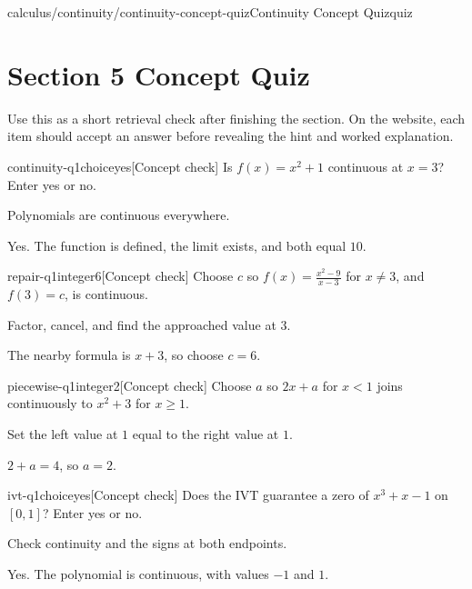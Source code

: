 \documentclass[11pt,openany]{book}
\theoremstyle{bgplain}
\newcounter{bgcheck}[section]
\begin{document}
\begin{webpage}{calculus/continuity/continuity-concept-quiz}{Continuity Concept Quiz}{quiz}
\section*{Section 5 Concept Quiz}

Use this as a short retrieval check after finishing the section. On the website, each item should accept an answer before revealing the hint and worked explanation.

\begin{bgcheck}{continuity-q1}{choice}{yes}[Concept check]
Is \(f(x)=x^2+1\) continuous at \(x=3\)? Enter yes or no.
\begin{bghint}
Polynomials are continuous everywhere.
\end{bghint}
\begin{bgreveal}
Yes. The function is defined, the limit exists, and both equal \(10\).
\end{bgreveal}
\end{bgcheck}

\begin{bgcheck}{repair-q1}{integer}{6}[Concept check]
Choose \(c\) so \(f(x)=\frac{x^2-9}{x-3}\) for \(x\ne3\), and \(f(3)=c\), is continuous.
\begin{bghint}
Factor, cancel, and find the approached value at \(3\).
\end{bghint}
\begin{bgreveal}
The nearby formula is \(x+3\), so choose \(c=6\).
\end{bgreveal}
\end{bgcheck}

\begin{bgcheck}{piecewise-q1}{integer}{2}[Concept check]
Choose \(a\) so \(2x+a\) for \(x<1\) joins continuously to \(x^2+3\) for \(x\ge1\).
\begin{bghint}
Set the left value at \(1\) equal to the right value at \(1\).
\end{bghint}
\begin{bgreveal}
\(2+a=4\), so \(a=2\).
\end{bgreveal}
\end{bgcheck}

\begin{bgcheck}{ivt-q1}{choice}{yes}[Concept check]
Does the IVT guarantee a zero of \(x^3+x-1\) on \([0,1]\)? Enter yes or no.
\begin{bghint}
Check continuity and the signs at both endpoints.
\end{bghint}
\begin{bgreveal}
Yes. The polynomial is continuous, with values \(-1\) and \(1\).
\end{bgreveal}
\end{bgcheck}


\end{webpage}
\end{document}
